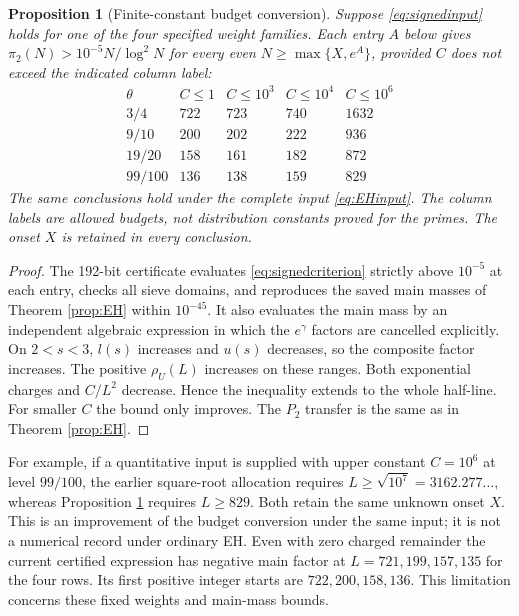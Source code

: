\documentclass[11pt]{article}
\newtheorem{proposition}[theorem]{Proposition}
\begin{document}
\begin{proposition}[Finite-constant budget conversion]\label{prop:weighted}
Suppose \eqref{eq:signedinput} holds for one of the four specified weight
families. Each entry $A$ below gives
$\pi_2(N)>10^{-5}N/\log^2N$ for every even $N\ge\max\{X,e^A\}$,
provided $C$ does not exceed the indicated column label:
\[
\begin{array}{c|rrrr}
\theta&C\le1&C\le10^3&C\le10^4&C\le10^6\\\hline
3/4&722&723&740&1632\\
9/10&200&202&222&936\\
19/20&158&161&182&872\\
99/100&136&138&159&829
\end{array}
\]
The same conclusions hold under the complete input \eqref{eq:EHinput}.
The column labels are allowed budgets, not distribution constants proved
for the primes. The onset $X$ is retained in every conclusion.
\end{proposition}
\begin{proof}
The 192-bit certificate evaluates \eqref{eq:signedcriterion} strictly
above $10^{-5}$ at each entry, checks all sieve domains, and reproduces
the saved main masses of Theorem \ref{prop:EH} within $10^{-45}$.
It also evaluates the main mass by an independent algebraic expression
in which the $e^\gamma$ factors are cancelled explicitly.
On $2<s<3$, $l(s)$ increases and $u(s)$ decreases, so the composite
factor increases. The positive $\rho_U(L)$ increases on these ranges.
Both exponential charges and $C/L^2$ decrease. Hence the inequality
extends to the whole half-line. For smaller $C$ the bound only improves.
The $P_2$ transfer is the same as in Theorem \ref{prop:EH}.
\end{proof}
For example, if a quantitative input is supplied with upper constant
$C=10^6$ at level $99/100$, the earlier square-root allocation requires
$L\ge\sqrt{10^7}=3162.277\ldots$, whereas Proposition
\ref{prop:weighted} requires $L\ge829$. Both retain the same unknown
onset $X$. This is an improvement of the budget conversion under the
same input; it is not a numerical record under ordinary EH.
Even with zero charged remainder the current certified expression has
negative main factor at $L=721,199,157,135$ for the four rows.
Its first positive integer starts are $722,200,158,136$.
This limitation concerns these fixed weights and main-mass bounds.

\end{document}
